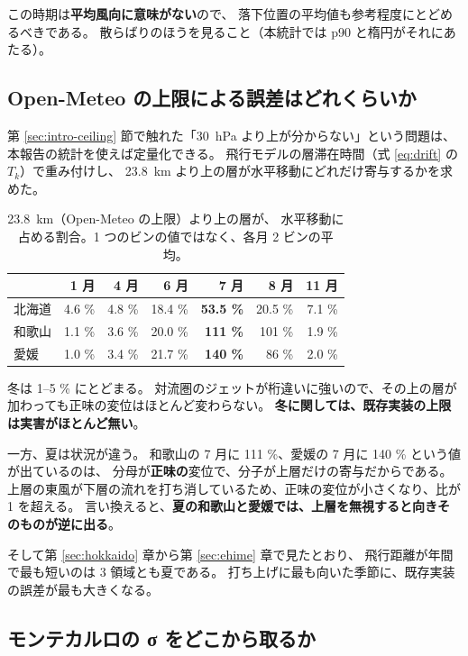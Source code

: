 この時期は\textbf{平均風向に意味がない}ので、
落下位置の平均値も参考程度にとどめるべきである。
散らばりのほうを見ること（本統計では p90 と楕円がそれにあたる）。

\subsection{Open-Meteo の上限による誤差はどれくらいか}
\label{sec:ceiling}

第 \ref{sec:intro-ceiling} 節で触れた「\SI{30}{\hecto\pascal} より上が分からない」という問題は、
本報告の統計を使えば定量化できる。
飛行モデルの層滞在時間（式 \eqref{eq:drift} の $T_k$）で重み付けし、
\SI{23.8}{\kilo\metre} より上の層が水平移動にどれだけ寄与するかを求めた。

\begin{table}[H]
\centering
\caption{\SI{23.8}{\kilo\metre}（Open-Meteo の上限）より上の層が、
水平移動に占める割合。1 つのビンの値ではなく、各月 2 ビンの平均。}
\begin{tabular}{lrrrrrr}
\toprule
 & 1 月 & 4 月 & 6 月 & 7 月 & 8 月 & 11 月 \\
\midrule
北海道 & 4.6 \% & 4.8 \% & 18.4 \% & \textbf{53.5 \%} & 20.5 \% & 7.1 \% \\
和歌山 & 1.1 \% & 3.6 \% & 20.0 \% & \textbf{111 \%} & 101 \% & 1.9 \% \\
愛媛   & 1.0 \% & 3.4 \% & 21.7 \% & \textbf{140 \%} & 86 \% & 2.0 \% \\
\bottomrule
\end{tabular}
\end{table}

冬は 1--5 \% にとどまる。
対流圏のジェットが桁違いに強いので、その上の層が加わっても正味の変位はほとんど変わらない。
\textbf{冬に関しては、既存実装の上限は実害がほとんど無い}。

一方、夏は状況が違う。
和歌山の 7 月に 111 \%、愛媛の 7 月に 140 \% という値が出ているのは、
分母が\textbf{正味の}変位で、分子が上層だけの寄与だからである。
上層の東風が下層の流れを打ち消しているため、正味の変位が小さくなり、比が 1 を超える。
言い換えると、\textbf{夏の和歌山と愛媛では、上層を無視すると向きそのものが逆に出る}。

そして第 \ref{sec:hokkaido} 章から第 \ref{sec:ehime} 章で見たとおり、
飛行距離が年間で最も短いのは 3 領域とも夏である。
打ち上げに最も向いた季節に、既存実装の誤差が最も大きくなる。

\subsection{モンテカルロの σ をどこから取るか}

